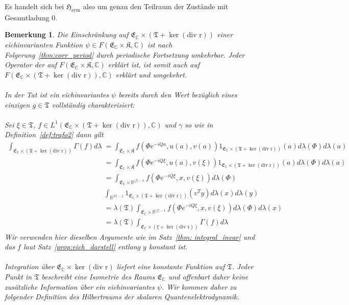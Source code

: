 \documentclass[11pt,a4paper,leqno]{report}
\newtheorem{remark}[theorem]{Bemerkung}
\numberwithin{equation}{chapter}
\begin{document}
\noindent
Es handelt sich bei $\mathfrak{H}_{\text{sym}}$ also um genau den Teilraum der Zust\"ande mit Gesamtladung 0.
\begin{remark}
	Die Einschr\"ankung auf $\mathfrak{E}_{\mathbb{C}}\times(\mathfrak{T}+\ker(\text{div r}))$ einer eichinvarianten Funktion $\psi\in F(\mathfrak{E}_{\mathbb{C}}\times\mathfrak{K},\mathbb{C})$ ist nach Folgerung~\ref{thm:corr_period} durch periodische Fortsetzung umkehrbar. Jeder Operator der auf $F(\mathfrak{E}_{\mathbb{C}}\times\mathfrak{K},\mathbb{C})$ erklärt ist, ist somit auch auf $F(\mathfrak{E}_{\mathbb{C}}\times(\mathfrak{T}+\ker(\text{div r})),\mathbb{C})$ erklärt und umgekehrt.
	\\
	\\
	In der Tat ist ein eichinvariantes $\psi$ bereits durch den Wert bezüglich eines  einzigen $g\in\mathfrak{T}$ vollständig charakterisiert:
	\\
	\\
	Sei $\xi\in \mathfrak{T}$, $f\in L^1(\mathfrak{E}_{\mathbb{C}}\times(\mathfrak{T}+\ker(\text{div r})),\mathbb{C})$ und $\gamma$ so wie in Definition~\ref{def:trafo2} dann gilt 
		\begin{align*}
	\int_{\mathfrak{E}_{\mathbb{C}}\times(\mathfrak{T}+\ker(\text{div r}))}\Gamma(f) d\lambda&= 
	\int_{\mathfrak{E}_{\mathbb{C}}\times\mathfrak{K}}f(\Phi e^{-iQa}, u(a),v(a)) 1_{\mathfrak{E}_{\mathbb{C}}\times(\mathfrak{T}+\ker(\text{div r}))}(a) d\lambda(\Phi)d\lambda(a) \\ &=
	 \int_{\mathfrak{E}_{\mathbb{C}}\times\mathfrak{K}}f(\Phi e^{-iQ\xi}, u(a),v(\xi)) 1_{\mathfrak{E}_{\mathbb{C}}\times(\mathfrak{T}+\ker(\text{div r}))}(a) d\lambda(\Phi)d\lambda(a) \\ &= 
	 \int_{\mathfrak{E}_{\mathbb{C}}\times\mathbb{R}^{|f|-1}}f(\Phi e^{-iQ\xi}, x,v(\xi))d\lambda(\Phi)\\& \int_{\mathbb{R}^{|V|-1}}1_{\mathfrak{E}_{\mathbb{C}}\times(\mathfrak{T}+\ker(\text{div r}))}(v^Ty) d\lambda(x)d\lambda(y) \\ &= 
	 \lambda(\mathfrak{T})\int_{\mathfrak{E}_{\mathbb{C}}\times\mathbb{R}^{|f|-1}}f(\Phi e^{-iQ\xi}, x,v(\xi)) d\lambda(\Phi)d\lambda(x) \\ &= \lambda(\mathfrak{T})\int_{\mathfrak{E}_{\mathbb{C}}\times(\xi + \ker(\text{div r}))}\Gamma(f) d\lambda
\end{align*}
Wir verwenden hier dieselben Argumente wie im Satz~\ref{thm: integral_invar} und das $f$ laut Satz~\ref{prop:eich_darstell} entlang $y$ konstant ist.
\\
\\
Integration über $\mathfrak{E}_{\mathbb{C}}\times\ker(\text{div r})$ liefert eine konstante Funktion auf $\mathfrak{T}$. Jeder Punkt in $\mathfrak{T}$ beschreibt eine Isometrie des Raums $\mathfrak{E}_{\mathbb{C}}$ und offenbart daher keine zusätzliche Information über ein eichinvariantes $\psi$. Wir kommen daher zu folgender Definition des Hilbertraums der skalaren Quantenelektrodynamik.
\end{remark}
\end{document}
